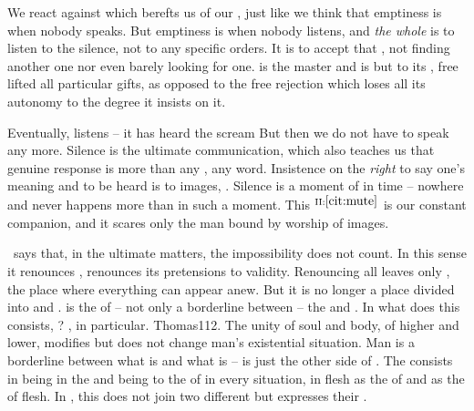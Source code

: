 \pa\label{pa:filling} We react against  which berefts us of our
, just like we think that emptiness is when nobody speaks.  But
emptiness is when nobody listens, and {\em the whole}  is to
listen to the silence, not to any specific orders. It is to accept that , not finding another one nor even barely looking for
one.  
is the master and  is but  to its , free
 lifted  all particular gifts, as opposed to the free
rejection which loses all its autonomy to the degree it insists on it.

Eventually,  listens -- it has heard the scream 
But then we do not have to speak any more. Silence is the ultimate
communication,  which also teaches us that genuine response is
more than any , any  word.  Insistence on the {\em
  right} to say one's meaning and to be heard is  to images,
. Silence is a moment of  in time -- nowhere and
never happens more than in such a moment. This $^{{\rm
    II}:\ref{cit:mute}}$ is our constant companion, and it scares only the man
bound by worship of images.

 \Yes\ says that, in the ultimate matters, the 
impossibility does not count. In this sense it renounces ,
renounces its pretensions to  validity.  Renouncing all
 leaves only , the place where everything can
appear anew. But it is no longer a place divided into  and
.  is the  of -- not only a
borderline between -- the  and .
In what does this  consists, ? , in
 particular.  \citet{Damn the flesh that depends on the soul. Damn
  the soul that depends on the flesh.}{Thomas}{112. }
The  unity of {soul} and {body}, of {higher} and {lower}, modifies
but does not change man's existential situation.  Man is a borderline between
what is  and what is  --  is just the other side
of . The  consists in being  in
the  and being  to the  of  in every
 situation, in  flesh as the  of
 and  as the  of flesh. In 
, this  does not join two different  but
expresses their \equin.

